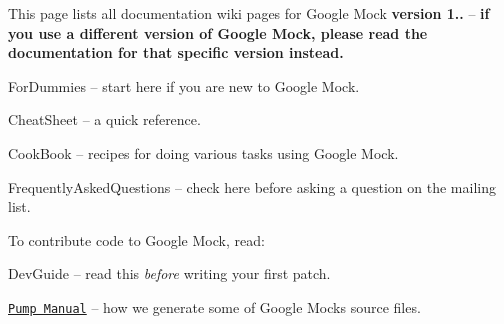 This page lists all documentation wiki pages for Google Mock {\bfseries version 1..} -- {\bfseries if you use a different version of Google Mock, please read the documentation for that specific version instead.}


\begin{DoxyItemize}
\item For\+Dummies -- start here if you are new to Google Mock.
\item Cheat\+Sheet -- a quick reference.
\item Cook\+Book -- recipes for doing various tasks using Google Mock.
\item Frequently\+Asked\+Questions -- check here before asking a question on the mailing list.
\end{DoxyItemize}

To contribute code to Google Mock, read\+:


\begin{DoxyItemize}
\item Dev\+Guide -- read this {\itshape before} writing your first patch.
\item \href{http://code.google.com/p/googletest/wiki/PumpManual}{\tt Pump Manual} -- how we generate some of Google Mock\textquotesingle{}s source files. 
\end{DoxyItemize}
